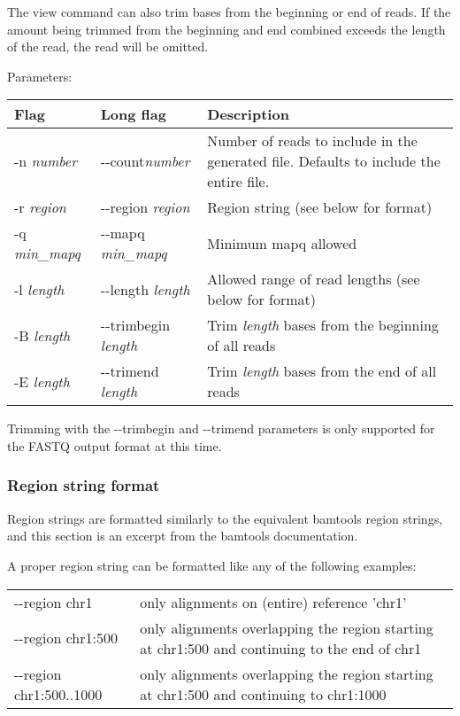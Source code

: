 \documentclass[11pt]{article}
\begin{document}
The view command can also trim bases from the beginning or end of reads. If the amount being trimmed from the beginning and end combined exceeds the length of the read, the read will be omitted.

Parameters:
\begin{center}
\begin{tabular}{llp{3.5in}}
\hline
Flag&Long flag&Description\\ \hline
-n \textit{number}&{-}{-}count\textit{number}&Number of reads to include in the generated file. Defaults to include the entire file.\\
-r \textit{region}&{-}{-}region \textit{region}&Region string (see below for format)\\
-q \textit{min\_mapq}&{-}{-}mapq \textit{min\_mapq}&Minimum mapq allowed\\
-l \textit{length}&{-}{-}length \textit{length}&Allowed range of read lengths (see below for format)\\
-B \textit{length}&{-}{-}trimbegin \textit{length}&Trim \textit{length} bases from the beginning of all reads\\
-E \textit{length}&{-}{-}trimend \textit{length}&Trim \textit{length} bases from the end of all reads\\
\end{tabular}
\end{center}

Trimming with the {-}{-}trimbegin and {-}{-}trimend parameters is only supported for the FASTQ output format at this time.

\subsubsection{Region string format}
Region strings are formatted similarly to the equivalent bamtools region strings, and this section is an excerpt from the bamtools documentation.

A proper region string can be formatted like any of the following examples:

\begin{center}
\begin{tabular}{lp{3.5in}}
{-}{-}region chr1&only alignments on (entire) reference 'chr1'\\
{-}{-}region chr1:500&only alignments overlapping the region starting at chr1:500 and continuing to the end of chr1\\
{-}{-}region chr1:500..1000&only alignments overlapping the region starting at chr1:500 and continuing to chr1:1000\\
\end{tabular}
\end{center}
\end{document}
